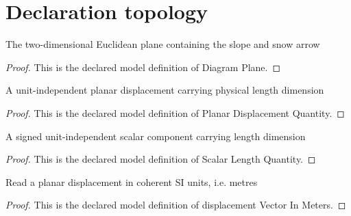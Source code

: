 \section{Declaration topology}
\begin{definition}
  \label{def:physics:phyx-mini-0678:phyxminiproblems-problemphyxmini0678-diagramplane}
  The two-dimensional Euclidean plane containing the slope and snow arrow
\end{definition}
\begin{proof}
  This is the declared model definition of Diagram Plane.
\end{proof}
\begin{definition}
  \label{def:physics:phyx-mini-0678:phyxminiproblems-problemphyxmini0678-planardisplacementquantity}
  A unit-independent planar displacement carrying physical length dimension
\end{definition}
\begin{proof}
  This is the declared model definition of Planar Displacement Quantity.
\end{proof}
\begin{definition}
  \label{def:physics:phyx-mini-0678:phyxminiproblems-problemphyxmini0678-scalarlengthquantity}
  A signed unit-independent scalar component carrying length dimension
\end{definition}
\begin{proof}
  This is the declared model definition of Scalar Length Quantity.
\end{proof}
\begin{definition}
  \label{def:physics:phyx-mini-0678:phyxminiproblems-problemphyxmini0678-displacementvectorinmeters}
  Read a planar displacement in coherent SI units, i.e. metres
\end{definition}
\begin{proof}
  This is the declared model definition of displacement Vector In Meters.
\end{proof}
